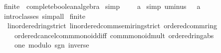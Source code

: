\begin{isabellebody}
{\isacartoucheclose}%
\endisatagML
{\isafoldML}%
%
\isadelimML
\isanewline
%
\endisadelimML
\isanewline
{}\isamarkupfalse%
\ finite{\isacharunderscore}{\kern0pt}{}\ {\isacharcolon}{\kern0pt}{\isacharcolon}{\kern0pt}\ complete{\isacharunderscore}{\kern0pt}boolean{\isacharunderscore}{\kern0pt}algebra\isanewline
{}\isanewline
{}\isamarkupfalse%
\ {\isacharbrackleft}{\kern0pt}simp{\isacharbrackright}{\kern0pt}{\isacharcolon}{\kern0pt}\ {\isachardoublequoteopen}{\isacharparenleft}{\kern0pt}{\isacharminus}{\kern0pt}{\isacharparenright}{\kern0pt}\ {\isacharequal}{\kern0pt}\ {\isacharparenleft}{\kern0pt}{\isasymlambda}{\isacharunderscore}{\kern0pt}\ {\isacharunderscore}{\kern0pt}{\isachardot}{\kern0pt}\ a\isanewline
{}\isamarkupfalse%
\ {\isacharbrackleft}{\kern0pt}simp{\isacharbrackright}{\kern0pt}{\isacharcolon}{\kern0pt}\ {\isachardoublequoteopen}uminus\ {\isacharequal}{\kern0pt}\ {\isacharparenleft}{\kern0pt}{\isasymlambda}{\isacharunderscore}{\kern0pt}{\isachardot}{\kern0pt}\ a\isanewline
{}\isamarkupfalse%
%
\isadelimproof
\ %
\endisadelimproof
%
\isatagproof
{}\isamarkupfalse%
\ intro{\isacharunderscore}{\kern0pt}classes\ simp{\isacharunderscore}{\kern0pt}all%
\endisatagproof
{\isafoldproof}%
%
\isadelimproof
%
\endisadelimproof
\isanewline
{}\isamarkupfalse%
\isanewline
\isanewline
{}\isamarkupfalse%
\ finite{\isacharunderscore}{\kern0pt}{}\ {\isacharcolon}{\kern0pt}{\isacharcolon}{\kern0pt}\ \isanewline
\ \ {\isachardoublequoteopen}{\isacharbraceleft}{\kern0pt}linordered{\isacharunderscore}{\kern0pt}ring{\isacharunderscore}{\kern0pt}strict{\isacharcomma}{\kern0pt}\ linordered{\isacharunderscore}{\kern0pt}comm{\isacharunderscore}{\kern0pt}semiring{\isacharunderscore}{\kern0pt}strict{\isacharcomma}{\kern0pt}\ ordered{\isacharunderscore}{\kern0pt}comm{\isacharunderscore}{\kern0pt}ring{\isacharcomma}{\kern0pt}\isanewline
\ \ \ \ ordered{\isacharunderscore}{\kern0pt}cancel{\isacharunderscore}{\kern0pt}comm{\isacharunderscore}{\kern0pt}monoid{\isacharunderscore}{\kern0pt}diff{\isacharcomma}{\kern0pt}\ comm{\isacharunderscore}{\kern0pt}monoid{\isacharunderscore}{\kern0pt}mult{\isacharcomma}{\kern0pt}\ ordered{\isacharunderscore}{\kern0pt}ring{\isacharunderscore}{\kern0pt}abs{\isacharcomma}{\kern0pt}\isanewline
\ \ \ \ one{\isacharcomma}{\kern0pt}\ modulo{\isacharcomma}{\kern0pt}\ sgn{\isacharcomma}{\kern0pt}\ inverse{\isacharbraceright}{\kern0pt}{\isachardoublequoteclose}\isanewline

\end{isabellebody}
